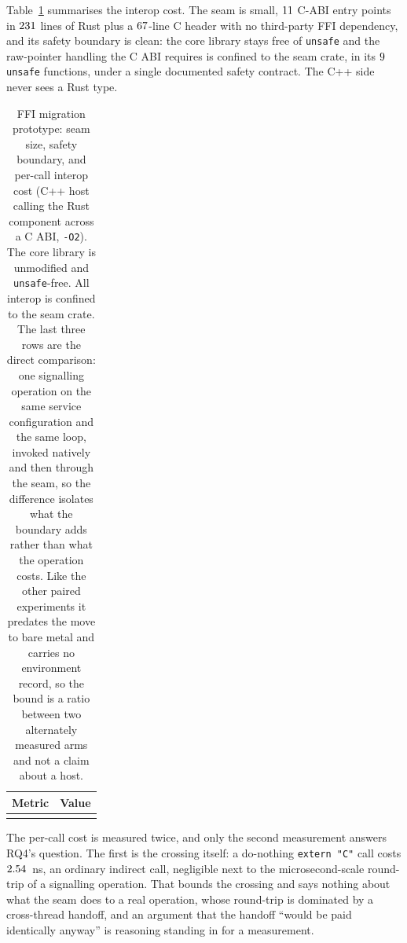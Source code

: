 \documentclass[english,oneside,a4paper,censored,csm,software-track-2020]{HYthesisML}
\begin{document}
Table~\ref{tab:ffi} summarises the interop cost. The seam is small, $11$ C-ABI entry
points in $231$ lines of Rust plus a $67$-line C header with no third-party
FFI dependency, and its safety boundary is clean: the core library stays free of \texttt{unsafe}
and the raw-pointer handling the C ABI requires is confined to the seam crate, in its
$9$ \texttt{unsafe} functions, under a single documented safety contract. The C++ side
never sees a Rust type.

\begin{table}[H]
\centering
\caption[FFI migration prototype: seam size, safety, and cost]{FFI migration prototype: seam size, safety boundary, and per-call interop cost
(C++ host calling the Rust component across a C ABI, \texttt{-O2}). The core library is
unmodified and \texttt{unsafe}-free. All interop is confined to the seam crate. The last
three rows are the direct comparison: one signalling operation on the same service
configuration and the same loop, invoked natively and then through the seam, so the
difference isolates what the boundary adds rather than what the operation
costs. Like the other paired experiments it predates the move to bare metal and carries no
environment record, so the bound is a ratio between two alternately measured arms and not a claim
about a host.\label{tab:ffi}}
\begin{tabular}{l r}
\hline\hline
Metric & Value \\
\hline
\\
\hline
\end{tabular}
\end{table}

The per-call cost is measured twice, and only the second measurement answers RQ4's question. The
first is the crossing itself: a do-nothing \texttt{extern "C"} call costs $2.54$~ns, an
ordinary indirect call, negligible next to the microsecond-scale round-trip of a signalling
operation. That bounds the crossing and says nothing about what the seam does to a real operation,
whose round-trip is dominated by a cross-thread handoff, and an argument that the handoff ``would
be paid identically anyway'' is reasoning standing in for a measurement.
\end{document}
